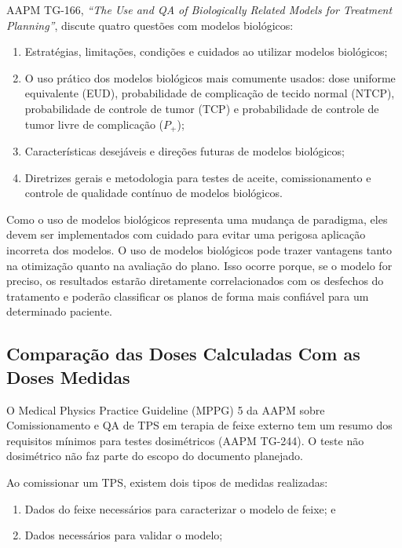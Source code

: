 \documentclass[11pt,a4paper]{article}
\begin{document}
	AAPM TG-166, \textit{``The Use and QA of Biologically Related Models for Treatment Planning''}, discute quatro questões com modelos biológicos:

	\begin{enumerate}
		\item Estratégias, limitações, condições e cuidados ao utilizar modelos biológicos;
		\item O uso prático dos modelos biológicos mais comumente usados: dose uniforme equivalente (EUD), probabilidade de complicação de tecido normal (NTCP), probabilidade de controle de tumor (TCP) e probabilidade de controle de tumor livre de complicação ($P_+$);
		\item Características desejáveis e direções futuras de modelos biológicos;
		\item Diretrizes gerais e metodologia para testes de aceite, comissionamento e controle de qualidade contínuo de modelos biológicos.
	\end{enumerate}

	Como o uso de modelos biológicos representa uma mudança de paradigma, eles devem ser implementados com cuidado para evitar uma perigosa aplicação incorreta dos modelos. O uso de modelos biológicos pode trazer vantagens tanto na otimização quanto na avaliação do plano. Isso ocorre porque, se o modelo for preciso, os resultados estarão diretamente correlacionados com os desfechos do tratamento e poderão classificar os planos de forma mais confiável para um determinado paciente.

\subsection*{Comparação das Doses Calculadas Com as Doses Medidas}

	O Medical Physics Practice Guideline (MPPG) 5 da AAPM sobre Comissionamento e QA de TPS em terapia de feixe externo tem um resumo dos requisitos mínimos para testes dosimétricos (AAPM TG-244). O teste não dosimétrico não faz parte do escopo do documento planejado.

	Ao comissionar um TPS, existem dois tipos de medidas realizadas:

	\begin{enumerate}[label=\textcolor{CarnationPink}{\roman*.}]
		\item Dados do feixe necessários para caracterizar o modelo de feixe; e
		\item Dados necessários para validar o modelo;
	\end{enumerate}
\end{document}
